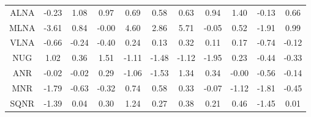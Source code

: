 \documentclass[11pt,a4paper]{report}
\begin{document}
\begin{longtable}{ | c || c | c | c | c | c | c | c | c | c || c |}
ALNA &  \cellcolor[HTML]{FFF7F7} -0.23 &  \cellcolor[HTML]{E7E7FF} 1.08 &  \cellcolor[HTML]{E7E7FF} 0.97 &  \cellcolor[HTML]{EFEFFF} 0.69 &  \cellcolor[HTML]{EFEFFF} 0.58 &  \cellcolor[HTML]{EFEFFF} 0.63 &  \cellcolor[HTML]{E7E7FF} 0.94 &  \cellcolor[HTML]{DFDFFF} 1.40 &  \cellcolor[HTML]{FFFFFF} -0.13 &  \cellcolor[HTML]{EFEFFF} 0.66 \\
MLNA &  \cellcolor[HTML]{FFA7A7} -3.61 &  \cellcolor[HTML]{E7E7FF} 0.84 &  \cellcolor[HTML]{FFFFFF} -0.00 &  \cellcolor[HTML]{8F8FFF} 4.60 &  \cellcolor[HTML]{B7B7FF} 2.86 &  \cellcolor[HTML]{7070FF} 5.71 &  \cellcolor[HTML]{FFFFFF} -0.05 &  \cellcolor[HTML]{EFEFFF} 0.52 &  \cellcolor[HTML]{FFCFCF} -1.91 &  \cellcolor[HTML]{E7E7FF} 0.99 \\
VLNA &  \cellcolor[HTML]{FFEFEF} -0.66 &  \cellcolor[HTML]{FFF7F7} -0.24 &  \cellcolor[HTML]{FFF7F7} -0.40 &  \cellcolor[HTML]{F7F7FF} 0.24 &  \cellcolor[HTML]{FFFFFF} 0.13 &  \cellcolor[HTML]{F7F7FF} 0.32 &  \cellcolor[HTML]{FFFFFF} 0.11 &  \cellcolor[HTML]{F7F7FF} 0.17 &  \cellcolor[HTML]{FFEFEF} -0.74 &  \cellcolor[HTML]{FFFFFF} -0.12 \\
NUG &  \cellcolor[HTML]{E7E7FF} 1.02 &  \cellcolor[HTML]{F7F7FF} 0.36 &  \cellcolor[HTML]{D7D7FF} 1.51 &  \cellcolor[HTML]{FFDFDF} -1.11 &  \cellcolor[HTML]{FFD7D7} -1.48 &  \cellcolor[HTML]{FFDFDF} -1.12 &  \cellcolor[HTML]{FFCFCF} -1.95 &  \cellcolor[HTML]{F7F7FF} 0.23 &  \cellcolor[HTML]{FFF7F7} -0.44 &  \cellcolor[HTML]{FFF7F7} -0.33 \\
ANR &  \cellcolor[HTML]{FFFFFF} -0.02 &  \cellcolor[HTML]{FFFFFF} -0.02 &  \cellcolor[HTML]{F7F7FF} 0.29 &  \cellcolor[HTML]{FFE7E7} -1.06 &  \cellcolor[HTML]{FFD7D7} -1.53 &  \cellcolor[HTML]{DFDFFF} 1.34 &  \cellcolor[HTML]{F7F7FF} 0.34 &  \cellcolor[HTML]{FFFFFF} -0.00 &  \cellcolor[HTML]{FFEFEF} -0.56 &  \cellcolor[HTML]{FFFFFF} -0.14 \\
MNR &  \cellcolor[HTML]{FFCFCF} -1.79 &  \cellcolor[HTML]{FFEFEF} -0.63 &  \cellcolor[HTML]{FFF7F7} -0.32 &  \cellcolor[HTML]{EFEFFF} 0.74 &  \cellcolor[HTML]{EFEFFF} 0.58 &  \cellcolor[HTML]{F7F7FF} 0.33 &  \cellcolor[HTML]{FFFFFF} -0.07 &  \cellcolor[HTML]{FFDFDF} -1.12 &  \cellcolor[HTML]{FFCFCF} -1.81 &  \cellcolor[HTML]{FFF7F7} -0.45 \\
SQNR &  \cellcolor[HTML]{FFDFDF} -1.39 &  \cellcolor[HTML]{FFFFFF} 0.04 &  \cellcolor[HTML]{F7F7FF} 0.30 &  \cellcolor[HTML]{DFDFFF} 1.24 &  \cellcolor[HTML]{F7F7FF} 0.27 &  \cellcolor[HTML]{F7F7FF} 0.38 &  \cellcolor[HTML]{F7F7FF} 0.21 &  \cellcolor[HTML]{F7F7FF} 0.46 &  \cellcolor[HTML]{FFD7D7} -1.45 &  \cellcolor[HTML]{FFFFFF} 0.01 \\

\end{longtable}
\end{document}
